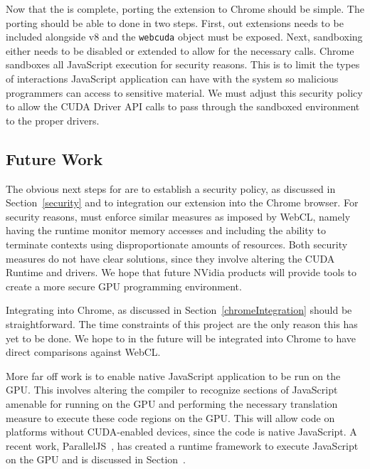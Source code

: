 Now that the \name is complete, porting the extension to Chrome should be
simple. The porting should be able to done in two steps. First, out extensions
needs to be included alongside v8 and the \texttt{webcuda} object must be
exposed.  Next, sandboxing either needs to be disabled or extended to allow for
the necessary \name calls. Chrome sandboxes all JavaScript execution for
security reasons. This is to limit the types of interactions JavaScript
application can have with the system so malicious programmers can access to
sensitive material. We must adjust this security policy to allow the CUDA Driver
API calls to pass through the sandboxed environment to the proper drivers. 


\subsection{Future Work}
\label{future}
The obvious next steps for \name are to establish a security policy, as
discussed in Section~\ref{security} and to integration our extension into the
Chrome browser. For security reasons, \name must enforce similar measures as
imposed by WebCL, namely having the runtime monitor memory accesses and
including the ability to terminate contexts using disproportionate amounts of
resources. Both security measures do not have clear solutions, since they involve
altering the CUDA Runtime and drivers. We hope that future NVidia products will
provide tools to create a more secure GPU programming environment.

Integrating \name into Chrome, as discussed in Section~\ref{chromeIntegration} should be
straightforward. The time constraints of this project are the only reason this
has yet to be done. We hope to in the future \name will be integrated into
Chrome to have direct comparisons against WebCL.

More far off work is to enable native JavaScript application to be run on the
GPU. This involves altering the compiler to recognize sections of JavaScript
amenable for running on the GPU and performing the necessary translation measure
to execute these code regions on the GPU. This will allow \name code on
platforms without CUDA-enabled devices, since the code is native JavaScript. A recent work,
ParallelJS~\cite{parallelJS}, has created a runtime framework to execute
JavaScript on the GPU and is discussed in Section~\cite{related}.


